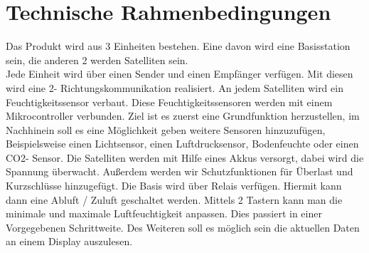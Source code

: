 \section{Technische Rahmenbedingungen}
Das Produkt wird aus 3 Einheiten bestehen. Eine davon wird eine Basisstation sein, die anderen 2 werden Satelliten sein.\\Jede Einheit wird über einen Sender und einen Empfänger verfügen. Mit diesen wird eine 2- Richtungskommunikation realisiert. An jedem Satelliten wird ein Feuchtigkeitssensor verbaut. Diese Feuchtigkeitssensoren werden mit einem Mikrocontroller verbunden. Ziel ist es zuerst eine Grundfunktion herzustellen, im Nachhinein soll es eine Möglichkeit geben weitere Sensoren hinzuzufügen, Beispielsweise einen Lichtsensor, einen Luftdrucksensor, Bodenfeuchte oder einen CO2- Sensor. Die Satelliten werden mit Hilfe eines Akkus versorgt, dabei wird die Spannung überwacht. Außerdem werden wir Schutzfunktionen für Überlast und Kurzschlüsse hinzugefügt.  Die Basis wird über Relais verfügen. Hiermit kann dann eine Abluft / Zuluft geschaltet werden. Mittels 2 Tastern kann man die minimale und maximale Luftfeuchtigkeit anpassen. Dies passiert in einer Vorgegebenen Schrittweite. Des Weiteren soll es möglich sein die aktuellen Daten an einem Display auszulesen. 
